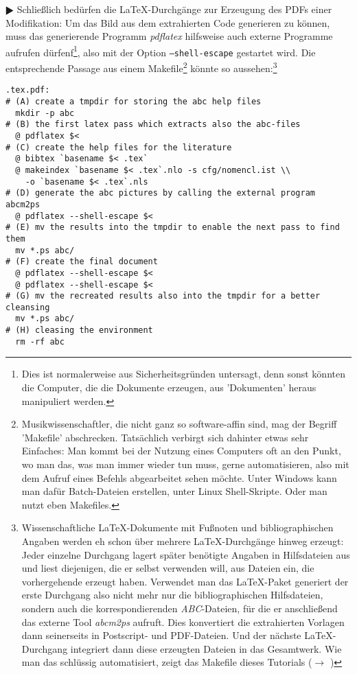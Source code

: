 $\RHD$ Schließlich bedürfen die \LaTeX-Durchgänge zur Erzeugung des PDFs einer
Modifikation: Um das Bild aus dem extrahierten Code generieren zu können, muss
das generierende Programm \textit{pdflatex} hilfsweise auch externe Programme
aufrufen dürfenf\footnote{Dies ist normalerweise aus Sicherheitsgründen
untersagt, denn sonst könnten die Computer, die die Dokumente erzeugen, aus
'Dokumenten' heraus manipuliert werden.}, also mit der Option
\texttt{--shell-escape} gestartet wird. Die entsprechende Passage aus einem
Makefile\footnote{Musikwissenschaftler, die nicht ganz so software-affin sind,
mag der Begriff 'Makefile' abschrecken. Tatsächlich verbirgt sich dahinter etwas
sehr Einfaches: Man kommt bei der Nutzung eines Computers oft an den Punkt, wo
man das, was man immer wieder tun muss, gerne automatisieren, also mit dem
Aufruf eines Befehls abgearbeitet sehen möchte. Unter Windows kann man dafür
Batch-Dateien erstellen, unter Linux Shell-Skripte. Oder man nutzt eben
Makefiles.} könnte so aussehen:\footnote{Wissenschaftliche \LaTeX-Dokumente mit
Fußnoten und bibliographischen Angaben werden eh schon über mehrere
\LaTeX-Durchgänge hinweg erzeugt: Jeder einzelne Durchgang lagert später
benötigte Angaben in Hilfsdateien aus und liest diejenigen, die er selbst
verwenden will, aus Dateien ein, die vorhergehende erzeugt haben. Verwendet man
das \LaTeX-Paket generiert der erste Durchgang also nicht mehr nur die
bibliographischen Hilfsdateien, sondern auch die korrespondierenden
\textit{ABC}-Dateien, für die er anschließend das externe Tool \textit{abcm2ps}
aufruft. Dies konvertiert die extrahierten Vorlagen dann seinerseits in
Postscript- und PDF-Dateien. Und der nächste \LaTeX-Durchgang integriert dann
diese erzeugten Dateien in das Gesamtwerk. Wie man das schlüssig automatisiert,
zeigt das Makefile dieses Tutorials ($\rightarrow$
) } 

\begin{small}
\begin{verbatim}
.tex.pdf:
# (A) create a tmpdir for storing the abc help files
  mkdir -p abc
# (B) the first latex pass which extracts also the abc-files
  @ pdflatex $<
# (C) create the help files for the literature        
  @ bibtex `basename $< .tex`
  @ makeindex `basename $< .tex`.nlo -s cfg/nomencl.ist \\
    -o `basename $< .tex`.nls
# (D) generate the abc pictures by calling the external program abcm2ps
  @ pdflatex --shell-escape $<
# (E) mv the results into the tmpdir to enable the next pass to find them
  mv *.ps abc/
# (F) create the final document 
  @ pdflatex --shell-escape $< 
  @ pdflatex --shell-escape $< 
# (G) mv the recreated results also into the tmpdir for a better cleansing
  mv *.ps abc/
# (H) cleasing the environment
  rm -rf abc
\end{verbatim}
\end{small}

